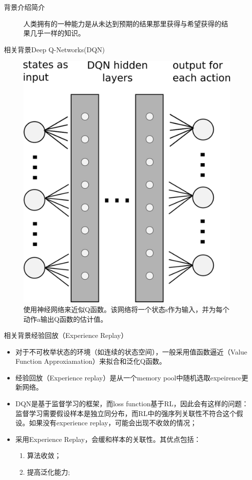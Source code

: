 \documentclass[10pt]{beamer}
\begin{document}
	\begin{frame}{背景介绍}{简介}
		\begin{figure}
			\centering
			\caption{人类拥有的一种能力是从未达到预期的结果那里获得与希望获得的结果几乎一样的知识。}\label{fig:idea-of-her}
		\end{figure}
	\end{frame}

	\begin{frame}{相关背景}{Deep Q-Networks(DQN)}
		\begin{figure}
			\centering
			\includegraphics[width=0.4\linewidth]{pictures/DQN}
			\caption{使用神经网络来近似Q函数。该网络将一个状态s作为输入，并为每个动作a输出Q函数的估计值。}
			\label{fig:dqn}
		\end{figure}
	\end{frame}

	\begin{frame}{相关背景}{经验回放（Experience Replay）}
		\begin{itemize}
			\item 对于不可枚举状态的环境（如连续的状态空间），一般采用值函数逼近（Value Function Approxiamation）来拟合和泛化Q函数。
			
			\item 经验回放（Experience replay）是从一个memory pool中随机选取expeirence更新网络。
			
			\item DQN是基于监督学习的框架，而loss function基于RL，因此会有这样的问题：监督学习需要假设样本是独立同分布，而RL中的强序列关联性不符合这个假设。如果没有experience replay，可能会出现不收敛的情况；
			
			\item 采用Experience Replay，会缓和样本的关联性。其优点包括：
				\begin{enumerate}
					\item 算法收敛；
					\item 提高泛化能力;
				\end{enumerate}
			
		\end{itemize}
	\end{frame}
\end{document}
